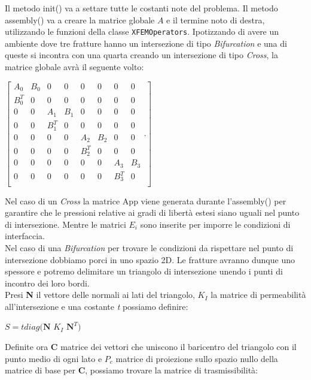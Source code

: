 Il metodo init() va a settare tutte le costanti note del problema.
Il metodo assembly() va a creare la matrice globale $A$ e il termine noto di destra, utilizzando le funzioni della classe \texttt{XFEMOperators}. 
Ipotizzando di avere un ambiente dove tre fratture hanno un intersezione di tipo \textit{Bifurcation} e una di queste si incontra con una quarta creando un intersezione di tipo \textit{Cross}, la matrice globale avrà il seguente volto:\\
 \begin{center}
  $ \left[ \begin{matrix}
 			A_{0} &  B_{0} & 0 & 0 & 0 & 0 & 0 & 0 \\ 
 			B_{0}^{T} & 0 & 0 & 0 & 0 & 0 & 0 & 0 \\
 			0 & 0 & A_{1} &  B_{1} & 0 & 0 & 0 & 0 \\ 
		 	0 & 0 & B_{1}^{T} & 0 & 0 & 0 & 0 & 0 \\
		 	0 & 0 & 0 & 0 & A_{2} &  B_{2} & 0 & 0 \\ 
		 	0 & 0 & 0 & 0 & B_{2}^{T} & 0 & 0 & 0 \\
		 	0 & 0 & 0 & 0 & 0 & 0 & A_{3} &  B_{3} \\ 
 			0 & 0 & 0 & 0 & 0 & 0 & B_{3}^{T} & 0 \\
 			\end{matrix}.\right] $ 
  \end{center}
Nel caso di un \textit{Cross} la matrice App viene generata durante l'assembly() per garantire che le pressioni relative ai gradi di libert\`{a} estesi siano uguali nel punto di intersezione. Mentre le matrici $E_{i}$ sono inserite per imporre le condizioni di interfaccia.\\
Nel caso di una \textit{Bifurcation} per trovare le condizioni da rispettare nel punto di intersezione dobbiamo porci in uno spazio 2D.
Le fratture avranno dunque uno spessore e potremo delimitare un triangolo di intersezione unendo i punti di incontro dei loro bordi. \\
Presi \textbf{N} il vettore delle normali ai lati del triangolo, \textbf{$K_{I}$} la matrice di permeabilit\`{a} all'intersezione e una costante \textit{t} possiamo definire:
\begin{center}
	$ S = \textit{t}diag( \textbf{N}$ \textbf{$K_{I}$} $ \textbf{N}^{T} ) $
\end{center}
Definite ora \textbf{C} matrice dei vettori che uniscono il baricentro del triangolo con il punto medio  di ogni lato e \textbf{$P_{c}$} matrice di proiezione sullo spazio nullo della matrice di base per \textbf{C}, possiamo trovare la matrice di trasmissibilit\`{a}:
